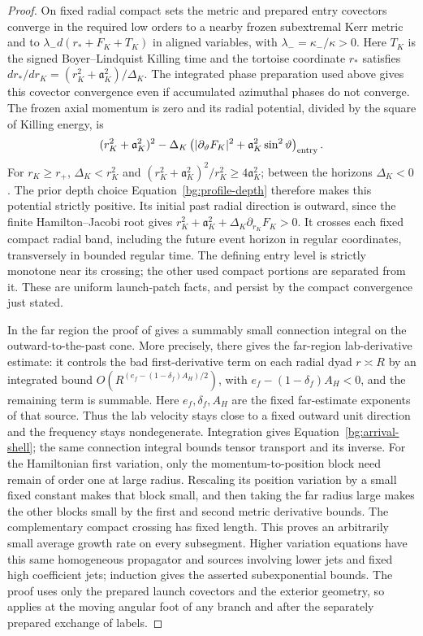\begin{proof}
On fixed radial compact sets the
metric and prepared entry covectors converge in the required low
orders to a nearby frozen subextremal Kerr metric and to
$\lambda_-d(r_*+F_K+T_K)$ in aligned variables, with
$\lambda_-=\kappa_-/\kappa>0$. Here $T_K$ is the signed
Boyer--Lindquist Killing time and the tortoise coordinate $r_*$
satisfies $dr_*/dr_K=(r_K^2+\mathfrak a_K^2)/\Delta_K$.
The integrated phase preparation used above gives
this covector convergence even if accumulated azimuthal phases do
not converge.  The frozen axial momentum is zero and its radial
potential, divided by the square of Killing energy, is
\begin{equation}\label{bg:radial-potential}
 (r_K^2+\mathfrak a_K^2)^2-\Delta_K
     \left(|\partial_\vartheta F_K|^2
                 +\mathfrak a_K^2\sin^2\vartheta\right)_{\rm entry}.
\end{equation}
For $r_K\ge r_+$, $\Delta_K<r_K^2$ and
$(r_K^2+\mathfrak a_K^2)^2/r_K^2\ge4\mathfrak a_K^2$;
between the horizons $\Delta_K<0$.  The prior depth choice
Equation~\eqref{bg:profile-depth} therefore makes this potential
strictly positive.  Its initial past radial direction is outward,
since the finite Hamilton--Jacobi root gives
$r_K^2+\mathfrak a_K^2+\Delta_K\partial_{r_K}F_K>0$.
It crosses each fixed compact radial band, including the future
event horizon in regular coordinates, transversely in bounded
regular time.  The defining entry level is strictly monotone near
its crossing; the other used compact portions are separated from it.
These are uniform launch-patch facts, and persist by the compact
convergence just stated.

In the far region the proof of  gives a summably
small connection integral on the outward-to-the-past cone.  More
precisely,  there gives the far-region lab-derivative estimate: it controls
the bad first-derivative term on each radial dyad $r\asymp R$ by
an integrated bound
$O(R^{(e_f-(1-\delta_f)A_H)/2})$, with
$e_f-(1-\delta_f)A_H<0$, and the remaining term is summable.
Here $e_f,\delta_f,A_H$ are the fixed far-estimate exponents of
that source.  Thus the lab velocity stays close to a fixed outward
unit direction and the frequency stays nondegenerate.  Integration
gives Equation~\eqref{bg:arrival-shell}; the same connection
integral bounds tensor transport and its inverse.
For the Hamiltonian first variation, only the momentum-to-position
block need remain of order one at large radius.  Rescaling its
position variation by a small fixed constant makes that block
small, and then taking the far radius large makes the other blocks
small by the first and second metric derivative bounds.  The
complementary compact crossing has fixed length.  This proves an
arbitrarily small average growth rate on every subsegment.
Higher variation equations have this same homogeneous propagator
and sources involving lower jets and fixed high coefficient jets;
induction gives the asserted subexponential bounds.  The proof
uses only the prepared launch covectors and the exterior geometry,
so applies at the moving angular foot of any branch and after
the separately prepared exchange of labels.
\end{proof}

